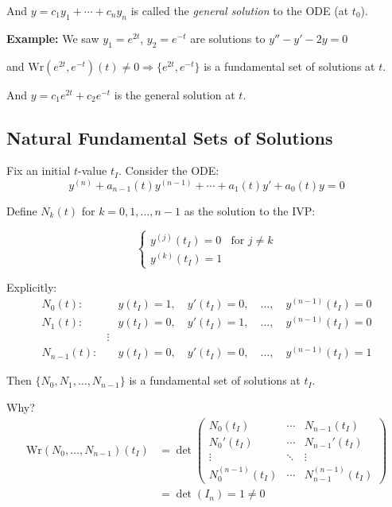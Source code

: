 \documentclass{article}
\begin{document}
And $y = c_1y_1 + \cdots + c_ny_n$ is called the \textit{general solution} to the ODE (at $t_0$).

\textbf{Example:} We saw $y_1 = e^{2t}$, $y_2 = e^{-t}$ are solutions to $y'' - y' - 2y = 0$

and $\text{Wr}(e^{2t}, e^{-t})(t) \neq 0 \Rightarrow \{e^{2t}, e^{-t}\}$ is a fundamental set of solutions at $t$.

And $y = c_1e^{2t} + c_2e^{-t}$ is the general solution at $t$.

\subsection*{Natural Fundamental Sets of Solutions}

Fix an initial $t$-value $t_I$. Consider the ODE:
\[
y^{(n)} + a_{n-1}(t)y^{(n-1)} + \cdots + a_1(t)y' + a_0(t)y = 0
\]

Define $N_k(t)$ for $k = 0, 1, \ldots, n-1$ as the solution to the IVP:

\[
\begin{cases}
y^{(j)}(t_I) = 0 & \text{for } j \neq k \\
y^{(k)}(t_I) = 1
\end{cases}
\]

Explicitly:
\begin{align*}
N_0(t): & \quad y(t_I) = 1, \quad y'(t_I) = 0, \quad \ldots, \quad y^{(n-1)}(t_I) = 0 \\
N_1(t): & \quad y(t_I) = 0, \quad y'(t_I) = 1, \quad \ldots, \quad y^{(n-1)}(t_I) = 0 \\
& \vdots \\
N_{n-1}(t): & \quad y(t_I) = 0, \quad y'(t_I) = 0, \quad \ldots, \quad y^{(n-1)}(t_I) = 1
\end{align*}

Then $\{N_0, N_1, \ldots, N_{n-1}\}$ is a fundamental set of solutions at $t_I$.

Why? 
\begin{align*}
\text{Wr}(N_0, \ldots, N_{n-1})(t_I) &= \det
\begin{pmatrix}
N_0(t_I) & \cdots & N_{n-1}(t_I) \\
N_0'(t_I) & \cdots & N_{n-1}'(t_I) \\
\vdots & \ddots & \vdots \\
N_0^{(n-1)}(t_I) & \cdots & N_{n-1}^{(n-1)}(t_I)
\end{pmatrix} \\
&= \det(I_n) = 1 \neq 0
\end{align*}
\end{document}
